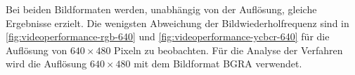 Bei beiden Bildformaten werden, unabhängig von der Auflösung, gleiche Ergebnisse erzielt. Die wenigsten Abweichung der
 Bildwiederholfrequenz sind in \autoref{fig:videoperformance-rgb-640} und \autoref{fig:videoperformance-ycbcr-640} für die
 Auflösung von $640 \times 480$ Pixeln zu beobachten. Für die Analyse der Verfahren wird die Auflösung
 $640 \times 480$ mit dem Bildformat BGRA verwendet.

